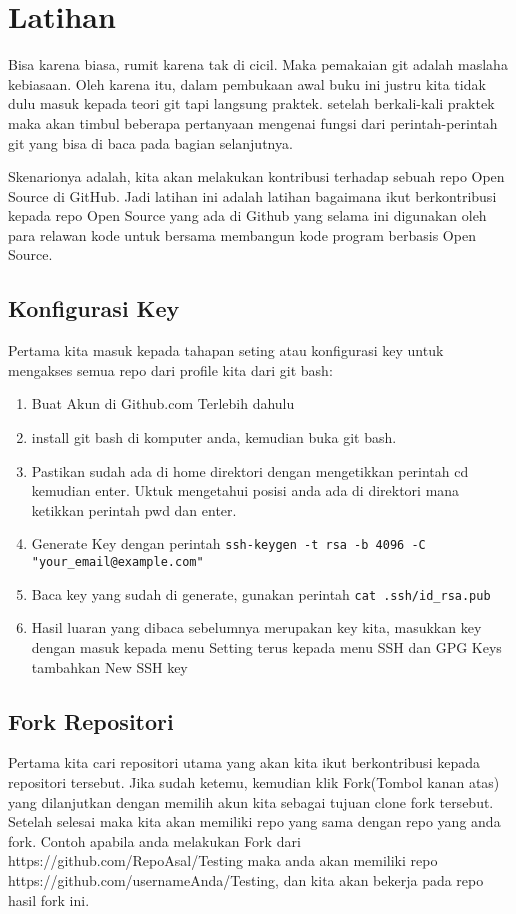 \section{Latihan}
Bisa karena biasa, rumit karena tak di cicil. Maka pemakaian git adalah maslaha kebiasaan. Oleh karena itu, dalam pembukaan awal buku ini justru kita tidak dulu masuk kepada teori git tapi langsung praktek. setelah berkali-kali praktek maka akan timbul beberapa pertanyaan mengenai fungsi dari perintah-perintah git yang bisa di baca pada bagian selanjutnya.

Skenarionya adalah, kita akan melakukan kontribusi terhadap sebuah repo Open Source di GitHub. Jadi latihan ini adalah latihan bagaimana ikut berkontribusi kepada repo Open Source yang ada di Github yang selama ini digunakan oleh para relawan kode untuk bersama membangun kode program berbasis Open Source.
\subsection{Konfigurasi Key}
Pertama kita masuk kepada tahapan seting atau konfigurasi key untuk mengakses semua repo dari profile kita dari git bash:
\begin{enumerate}
\item Buat Akun di Github.com Terlebih dahulu
\item install git bash di komputer anda, kemudian buka git bash.
\item Pastikan sudah ada di home direktori dengan mengetikkan perintah cd kemudian enter. Uktuk mengetahui posisi anda ada di direktori mana ketikkan perintah pwd dan enter.
\item Generate Key dengan perintah
\verb|ssh-keygen -t rsa -b 4096 -C "your_email@example.com"|
\item Baca key yang sudah di generate, gunakan perintah
\verb|cat .ssh/id_rsa.pub|
\item Hasil luaran yang dibaca sebelumnya merupakan key kita, masukkan key dengan masuk kepada menu Setting terus kepada menu SSH dan GPG Keys tambahkan New SSH key
\end{enumerate}

\subsection{Fork Repositori}
Pertama kita cari repositori utama yang akan kita ikut berkontribusi kepada repositori tersebut. Jika sudah ketemu, kemudian klik Fork(Tombol kanan atas) yang dilanjutkan dengan memilih akun kita sebagai tujuan clone fork tersebut. Setelah selesai maka kita akan memiliki repo yang sama dengan repo yang anda fork. Contoh apabila anda melakukan Fork dari https://github.com/RepoAsal/Testing maka anda akan memiliki repo https://github.com/usernameAnda/Testing, dan kita akan bekerja pada repo hasil fork ini.

